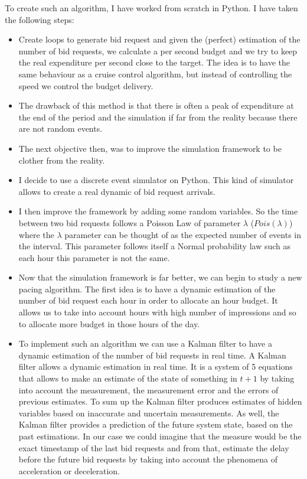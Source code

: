 \documentclass[12pt]{article}
\begin{document}
To create such an algorithm, I have worked from scratch in Python. I have taken the following steps:
\begin{itemize}
\item Create loops to generate bid request and given the (perfect) estimation of the number of bid requests, we calculate a per second budget and we try to keep the real expenditure per second close to the target. The idea is to have the same behaviour as a cruise control algorithm, but instead of controlling the speed we control the budget delivery.
\item The drawback of this method is that there is often a peak of expenditure at the end of the period and the simulation if far from the reality because there are not random events. 
\item The next objective then, was to improve the simulation framework to be clother from the reality.
\item I decide to use a discrete event simulator on Python. This kind of simulator allows to create a real dynamic of bid request arrivals.
\item I then improve the framework by adding some random variables. So the time between two bid requests follows a Poisson Law of parameter $\lambda$ ($Pois(\lambda)$) where the $\lambda$ parameter can be thought of as the expected number of events in the interval. This parameter follows itself a Normal probability law such as each hour this parameter is not the same. 
\item Now that the simulation framework is far better, we can begin to study a new pacing algorithm. The first idea is to have a dynamic estimation of the number of bid request each hour in order to allocate an hour budget. It allows us to take into account hours with high number of impressions and so to allocate more budget in those hours of the day. 
\item To implement such an algorithm we can use a Kalman filter to have a dynamic estimation of the number of bid requests in real time. A Kalman filter allows a dynamic estimation in real time. It is a system of 5 equations that allows to make an estimate of the state of something in $t+1$ by taking into account the measurement, the measurement error and the errors of previous estimates. To sum up the Kalman filter produces estimates of hidden variables based on inaccurate and uncertain measurements. As well, the Kalman filter provides a prediction of the future system state, based on the past estimations. In our case we could imagine that the measure would be the exact timestamp of the last bid requests and from that, estimate the delay before the future bid requests by taking into account the phenomena of acceleration or deceleration. 

\end{itemize}
\end{document}
